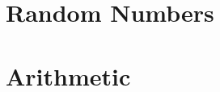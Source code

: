 \documentclass[main.tex]{subfiles}
\begin{document}
\chapter{Random Numbers}


\chapter{Arithmetic}

\end{document}
